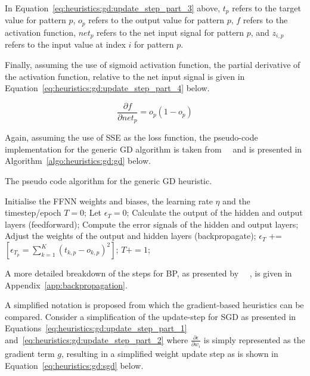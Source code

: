\noindent
In Equation~\eqref{eq:heuristics:gd:update_step_part_3} above, $t_{p}$ refers to the target value for pattern $p$, $o_{p}$ refers to the output value for pattern $p$, $f$ refers to the activation function, $net_{p}$ refers to the net input signal for pattern $p$, and $z_{i,p}$ refers to the input value at index $i$ for pattern $p$.

Finally, assuming the use of sigmoid activation function, the partial derivative of the activation function, relative to the net input signal is given in Equation~\eqref{eq:heuristics:gd:update_step_part_4} below.

\begin{equation}
      \label{eq:heuristics:gd:update_step_part_4}
      \frac{\partial f}{\partial net_{p}} = o_p(1 - o_{p})
\end{equation}

\noindent
Again, assuming the use of \acs{SSE} as the loss function, the pseudo-code implementation for the generic \acs{GD} algorithm is taken from~\citeauthor{ref:engelbrecht:2007}~\cite{ref:engelbrecht:2007} and is presented in Algorithm~\ref{algo:heuristics:gd:gd} below.

\begin{algorithm}[H]
      \caption{The pseudo code algorithm for the generic \acf{GD} heuristic.}
      \label{algo:heuristics:gd:gd}
      \begin{algorithmic}
            \State Initialise the \acs{FFNN} weights and biases, the learning rate $\eta$ and the timestep/epoch $T=0$;
            \State Let $\epsilon_{T} = 0$;
            \State Calculate the output of the hidden and output layers (feedforward);
            \State Compute the error signals of the hidden and output layers;
            \State Adjust the weights of the output and hidden layers (backpropagate);
            \State $\epsilon_{T}$ += $[\epsilon_{T_{p}} = \sum^{K}_{k=1}(t_{k,p} - o_{k,p})^{2}]$;
            \EndFor
            \State $T += 1$;
            \EndWhile
      \end{algorithmic}
\end{algorithm}

\noindent
A more detailed breakdown of the steps for \acs{BP}, as presented by ~\citeauthor{ref:engelbrecht:2007}~\cite{ref:engelbrecht:2007}, is given in Appendix~\ref{app:backpropagation}.

A simplified notation is proposed from which the gradient-based heuristics can be compared. Consider a simplification of the update-step for \acs{SGD} as presented in Equations~\eqref{eq:heuristics:gd:update_step_part_1} and~\eqref{eq:heuristics:gd:update_step_part_2} where $\frac{\partial \epsilon}{\partial w_{i}}$ is simply represented as the gradient term $g$, resulting in a simplified weight update step as is shown in Equation~\eqref{eq:heuristics:gd:sgd} below.

